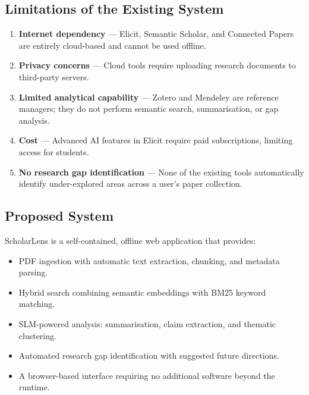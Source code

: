 \documentclass[12pt,a4paper]{article}
\begin{document}
\subsection{Limitations of the Existing System}
\begin{enumerate}[leftmargin=2em]
    \item \textbf{Internet dependency} --- Elicit, Semantic Scholar, and
          Connected Papers are entirely cloud-based and cannot be used
          offline.
    \item \textbf{Privacy concerns} --- Cloud tools require uploading
          research documents to third-party servers.
    \item \textbf{Limited analytical capability} --- Zotero and Mendeley
          are reference managers; they do not perform semantic search,
          summarisation, or gap analysis.
    \item \textbf{Cost} --- Advanced AI features in Elicit require paid
          subscriptions, limiting access for students.
    \item \textbf{No research gap identification} --- None of the
          existing tools automatically identify under-explored areas
          across a user's paper collection.
\end{enumerate}

\subsection{Proposed System}
ScholarLens is a self-contained, offline web application that provides:
\begin{itemize}[leftmargin=2em]
    \item PDF ingestion with automatic text extraction, chunking, and
          metadata parsing.
    \item Hybrid search combining semantic embeddings with BM25
          keyword matching.
    \item SLM-powered analysis: summarisation, claim extraction, and
          thematic clustering.
    \item Automated research gap identification with suggested future
          directions.
    \item A browser-based interface requiring no additional software
          beyond the runtime.
\end{itemize}
\end{document}
